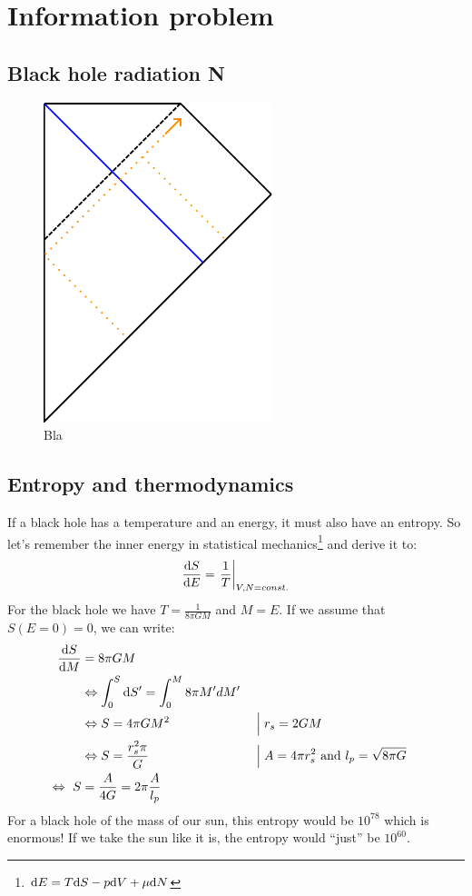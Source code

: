 \section{Information problem}

	\subsection{Black hole radiation N} 
	\begin{figure}
		\begin{center}
			\includegraphics[scale=1]{collapse2}
			\caption{Bla} 
		\end{center}
	\end{figure}

	\subsection{Entropy and thermodynamics \checkmark}
	If a black hole has a temperature and an energy, it must also have an entropy. So let's remember the inner energy in statistical mechanics\footnote{$\mathrm{d} E = 
	T \mathrm{d} S - p \mathrm{d} V + \mu \mathrm{d} N$} and derive it to:
		\begin{equation}
			\frac{\mathrm{d} S}{\mathrm{d} E} = \left. \frac{1}{T} \right|_{V,N=const.}
		\end{equation}
	For the black hole we have $T = \frac{1}{8 \pi G M}$ and $M=E$. If we assume that $S(E=0) = 0$, we can write:
		\begin{align}
			\frac{\mathrm{d} S}{\mathrm{d} M} &= 8 \pi G M \nonumber \\
			&\Leftrightarrow \int_0^S \mathrm{d} S' = \int_0^M 8 \pi M' dM' \nonumber\\
			&\Leftrightarrow S = 4 \pi G M^2 & & \Bigm| r_s = 2GM \nonumber\\
			&\Leftrightarrow S = \frac{r_s^2 \pi}{G}  & & \Bigm| A=4 \pi r_s^2 \text{~and~} l_p = \sqrt{8 \pi G} \nonumber\\
			\Leftrightarrow~
			S &= \frac{A}{4G} = 2 \pi \frac{A}{l_p} \label{entropy}
		\end{align}
	For a black hole of the mass of our sun, this entropy would be $10^{78}$ which is enormous! If we take the sun like it is, the entropy would ``just'' be $10^{60}$. 
	

